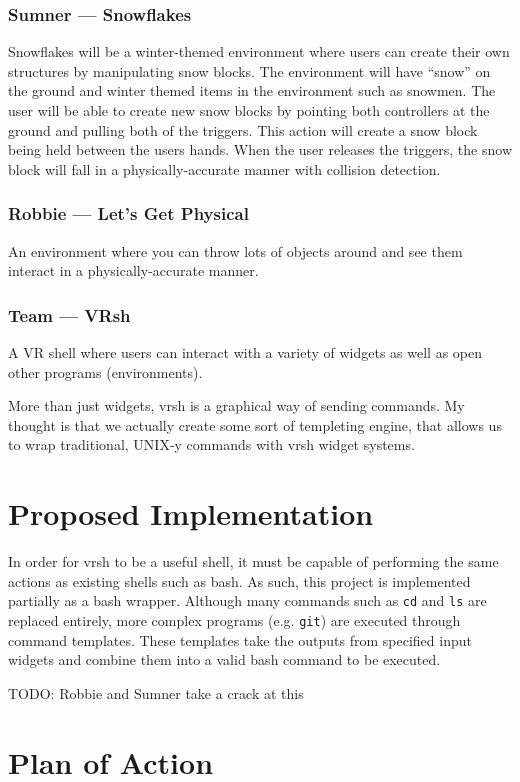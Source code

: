 \documentclass[titlepage,12pt]{article}
\begin{document}
\subsubsection{Sumner --- Snowflakes}
Snowflakes will be a winter-themed environment where users can create their own
structures by manipulating snow blocks. The environment will have ``snow'' on
the ground and winter themed items in the environment such as snowmen. The user
will be able to create new snow blocks by pointing both controllers at the
ground and pulling both of the triggers. This action will create a snow block
being held between the users hands. When the user releases the triggers, the
snow block will fall in a physically-accurate manner with collision detection.

\subsubsection{Robbie --- Let's Get Physical}
An environment where you can throw lots of objects around and see them interact
in a physically-accurate manner.

\subsubsection{Team --- VRsh}
A VR shell where users can interact with a variety of widgets as well as open
other programs (environments).

More than just widgets, vrsh is a graphical way
of sending commands. My thought is that we actually create some sort of
templeting engine, that allows us to wrap traditional, UNIX-y commands with vrsh
widget systems.

\section{Proposed Implementation}

In order for vrsh to be a useful shell, it must be capable of performing the same 
actions as existing shells such as bash. As such, this project is implemented 
partially as a bash wrapper. Although many commands such as \texttt{cd} and
\texttt{ls} are replaced entirely, more complex programs (e.g. \texttt{git}) 
are executed through command templates. These templates take the outputs from specified 
input widgets and combine them into a valid bash command to be executed. 

TODO: Robbie and Sumner take a crack at this

\section{Plan of Action}
\end{document}
